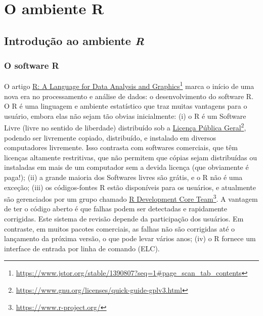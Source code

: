 \documentclass[
]{book}
\numberwithin{equation}{section}
\begin{document}
\hypertarget{part-o-ambiente-r}{%
\part{O ambiente R}\label{part-o-ambiente-r}}

\hypertarget{intro}{%
\chapter{\texorpdfstring{Introdução ao ambiente \emph{R}}{Introdução ao ambiente R}}\label{intro}}

\hypertarget{o-software-r}{%
\section{O software R}\label{o-software-r}}

O artigo \href{https://www.jstor.org/stable/1390807?seq=1\#page_scan_tab_contents}{R: A Language for Data Analysis and Graphics}\footnote{\url{https://www.jstor.org/stable/1390807?seq=1\#page_scan_tab_contents}} marca o início de uma nova era no processamento e análise de dados: o desenvolvimento do software R. O R é uma linguagem e ambiente estatístico que traz muitas vantagens para o usuário, embora elas não sejam tão obvias inicialmente: (i) o R é um Software Livre (livre no sentido de liberdade) distribuído sob a \href{https://www.gnu.org/licenses/quick-guide-gplv3.html}{Licença Pública Geral}\footnote{\url{https://www.gnu.org/licenses/quick-guide-gplv3.html}}, podendo ser livremente copiado, distribuído, e instalado em diversos computadores livremente. Isso contrasta com softwares comerciais, que têm licenças altamente restritivas, que não permitem que cópias sejam distribuídas ou instaladas em mais de um computador sem a devida licença (que obviamente é paga!); (ii) a grande maioria dos Softwares livres são grátis, e o R não é uma exceção; (iii) os códigos-fontes R estão disponíveis para os usuários, e atualmente são gerenciados por um grupo chamado \href{https://www.r-project.org/}{R Development Core Team}\footnote{\url{https://www.r-project.org/}}. A vantagem de ter o código aberto é que falhas podem ser detectadas e rapidamente corrigidas. Este sistema de revisão depende da participação dos usuários. Em contraste, em muitos pacotes comerciais, as falhas não são corrigidas até o lançamento da próxima versão, o que pode levar vários anos; (iv) o R fornece um interface de entrada por linha de comando (ELC).
\end{document}
